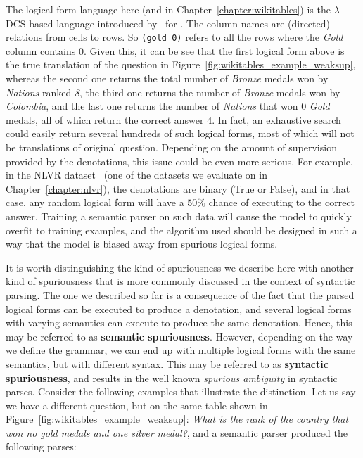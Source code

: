 The logical form language here (and in Chapter~\ref{chapter:wikitables}) is the
$\lambda$-DCS based language introduced by~\cite{pasupat2015compositional} for
\WTQ{}. The column names are (directed) relations from cells to rows. So
\texttt{(gold 0)} refers to all the rows where the \emph{Gold} column contains
$0$. Given this, it can be see that the first logical form above is the true
translation of the question in Figure~\ref{fig:wikitables_example_weaksup},
whereas the second one returns the total number of \emph{Bronze} medals won by
\emph{Nations} ranked \emph{8}, the third one returns the number of \emph{Bronze}
medals won by \emph{Colombia}, and the last one returns the number of
\emph{Nations} that won $0$ \emph{Gold} medals, all of which return the correct
answer $4$. In fact, an exhaustive search could easily return several hundreds
of such logical forms, most of which will not be translations of original
question. Depending on the amount of supervision provided by the denotations,
this issue could be even more serious. For example, in the NLVR
dataset~\citep{suhr2017corpus} (one of the datasets we evaluate on in
Chapter~\ref{chapter:nlvr}), the denotations are binary (True or False), and
in that case, any random logical form will have a $50\%$ chance of executing to
the correct answer. Training a semantic parser on such data will cause the model to quickly overfit to
training examples, and the algorithm used should be designed in such a way that
the model is biased away from spurious logical forms.

It is worth distinguishing the kind of spuriousness we describe here with another kind of
spuriousness that is more commonly discussed in the context of syntactic parsing. The
one we described so far is a consequence of the fact that the parsed logical forms
can be executed to produce a denotation, and several logical forms with varying semantics
can execute to produce the same denotation. Hence, this may be referred to as 
\textbf{semantic spuriousness}. However, depending on the way we define the grammar, we
can end up with multiple logical forms with the same semantics, but with different syntax.
This may be referred to as \textbf{syntactic spuriousness}, and results in the well known
\textit{spurious ambiguity} in syntactic parses. Consider the following examples that
illustrate the distinction. Let us say we have a different question, but on the same table shown in
Figure~\ref{fig:wikitables_example_weaksup}: \textit{What is the rank of the country that won no gold medals
and one silver medal?}, and a semantic parser produced the following parses:

